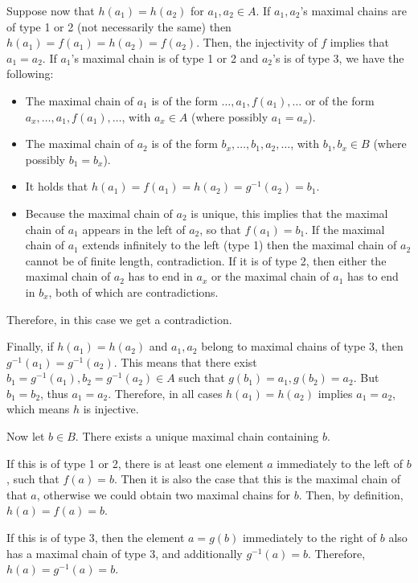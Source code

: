 \begin{solution}
    Suppose now that $h(a_1) = h(a_2)$ for $a_1, a_2 \in A$. If $a_1, a_2$'s maximal chains are of type 1 or 2 (not necessarily the same) then $h(a_1) = f(a_1) = h(a_2) = f(a_2)$. Then, the injectivity of $f$ implies that $a_1 = a_2$. If $a_1$'s maximal chain is of type 1 or 2 and $a_2$'s is of type 3, we have the following:
    \begin{itemize}
        \item The maximal chain of $a_1$ is of the form $\ldots, a_1, f(a_1), \ldots$ or of the form $a_x, \ldots, a_1, f(a_1), \ldots$, with $a_x \in A$ (where possibly $a_1 = a_x$).
        \item The maximal chain of $a_2$ is of the form $b_x, \ldots, b_1, a_2, \ldots$, with $b_1, b_x \in B$ (where possibly $b_1 = b_x$).
        \item  It holds that $h(a_1) = f(a_1) = h(a_2) = g^{-1}(a_2) = b_1$.
        \item Because the maximal chain of $a_2$ is unique, this implies that the maximal chain of $a_1$ appears in the left of $a_2$, so that $f(a_1) = b_1$. If the maximal chain of $a_1$ extends infinitely to the left (type 1) then the maximal chain of $a_2$ cannot be of finite length, contradiction. If it is of type 2, then either the maximal chain of $a_2$ has to end in $a_x$ or the maximal chain of $a_1$ has to end in $b_x$, both of which are contradictions.
    \end{itemize}

    Therefore, in this case we get a contradiction.

    Finally, if $h(a_1) = h(a_2)$ and $a_1, a_2$ belong to maximal chains of type 3, then $g^{-1}(a_1) = g^{-1}(a_2)$. This means that there exist $b_1 = g^{-1}(a_1), b_2 =g^{-1}(a_2) \in A$ such that $g(b_1) = a_1, g(b_2) = a_2$. But $b_1 = b_2$, thus $a_1 = a_2$. Therefore, in all cases $h(a_1) = h(a_2)$ implies $a_1 = a_2$, which means $h$ is injective.

    Now let $b \in B$. There exists a unique maximal chain containing $b$. 
    
    If this is of type 1 or 2, there is at least one element $a$ immediately to the left of $b$, such that $f(a) = b$. Then it is also the case that this is the maximal chain of that $a$, otherwise we could obtain two maximal chains for $b$. Then, by definition, $h(a) = f(a) = b$.

    If this is of type 3, then the element $a = g(b)$ immediately to the right of $b$ also has a maximal chain of type 3, and additionally $g^{-1}(a) = b$. Therefore, $h(a) = g^{-1}(a) = b$. 
    

\end{solution}
